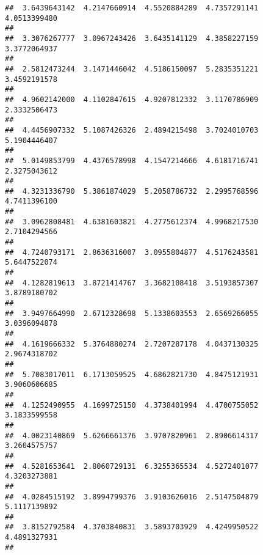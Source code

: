 \documentclass[]{article}
\begin{document}
\begin{verbatim}
##  3.6439643142  4.2147660914  4.5520884289  4.7357291141  4.0513399480 
##                                                                       
##  3.3076267777  3.0967243426  3.6435141129  4.3858227159  3.3772064937 
##                                                                       
##  2.5812473244  3.1471446042  4.5186150097  5.2835351221  3.4592191578 
##                                                                       
##  4.9602142000  4.1102847615  4.9207812332  3.1170786909  2.3332506473 
##                                                                       
##  4.4456907332  5.1087426326  2.4894215498  3.7024010703  5.1904446407 
##                                                                       
##  5.0149853799  4.4376578998  4.1547214666  4.6181716741  2.3275043612 
##                                                                       
##  4.3231336790  5.3861874029  5.2058786732  2.2995768596  4.7411396100 
##                                                                       
##  3.0962808481  4.6381603821  4.2775612374  4.9968217530  2.7104294566 
##                                                                       
##  4.7240793171  2.8636316007  3.0955804877  4.5176243581  5.6447522074 
##                                                                       
##  4.1282819613  3.8721414767  3.3682108418  3.5193857307  3.8789180702 
##                                                                       
##  3.9497664990  2.6712328698  5.1338603553  2.6569266055  3.0396094878 
##                                                                       
##  4.1619666332  5.3764880274  2.7207287178  4.0437130325  2.9674318702 
##                                                                       
##  5.7083017011  6.1713059525  4.6862821730  4.8475121931  3.9060606685 
##                                                                       
##  4.1252490955  4.1699725150  4.3738401994  4.4700755052  3.1833599558 
##                                                                       
##  4.0023140869  5.6266661376  3.9707820961  2.8906614317  3.2604575757 
##                                                                       
##  4.5281653641  2.8060729131  6.3255365534  4.5272401077  4.3203273881 
##                                                                       
##  4.0284515192  3.8994799376  3.9103626016  2.5147504879  5.1117139892 
##                                                                       
##  3.8152792584  4.3703840831  3.5893703929  4.4249950522  4.4891327931 
##                                                                       

\end{verbatim}
\end{document}
